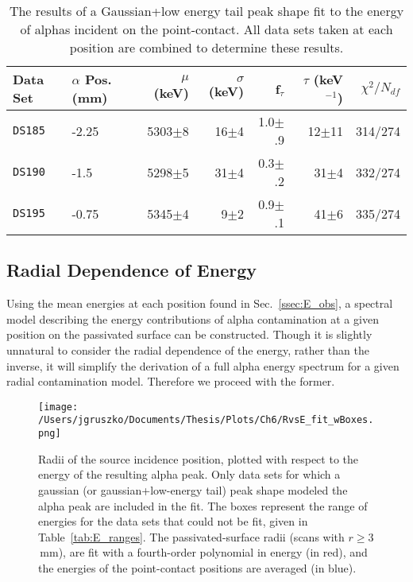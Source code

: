 \begin{table*}[]
\begin{center}
\begin{tabular}{l l r r r r r}
Data Set & $\alpha$ Pos. (mm) & $\mu$ (keV) & $\sigma$ (keV) & f$_{\tau}$ & $\tau$ (keV$^{-1}$)& $\chi^2/N_{df}$ \\  \hline
{\tt DS185} & -2.25 & 5303$\pm$8 & 16$\pm$4 & 1.0$\pm$.9 & 12$\pm$11 & 314/274 \\
{\tt DS190} & -1.5 & 5298$\pm$5 & 31$\pm$4 & 0.3$\pm$.2 & 31$\pm$4 & 332/274 \\
{\tt DS195} & -0.75 & 5345$\pm$4 & 9$\pm$2 & 0.9$\pm$.1 & 41$\pm$6 & 335/274 \\
\end{tabular}
\caption[The results of fits to the alpha energy peak for events occurring in the point contact]{The results of a Gaussian+low energy tail peak shape fit to the energy of alphas incident on the point-contact. All data sets taken at each position are combined to determine these results.} \label{tab:fullE_fitRes}
\end{center}
\end{table*}

\subsection{Radial Dependence of Energy}\label{sssec:spec_fit}
Using the mean energies at each position found in Sec.~\ref{ssec:E_obs}, a spectral model describing the energy contributions of alpha contamination at a given position on the passivated surface can be constructed. Though it is slightly unnatural to consider the radial dependence of the energy, rather than the inverse, it will simplify the derivation of a full alpha energy spectrum for a given radial contamination model. Therefore we proceed with the former.

\begin{figure}[]
 \centering
 \texttt{[image: /Users/jgruszko/Documents/Thesis/Plots/Ch6/RvsE\_fit\_wBoxes.png]}
 \caption[A polynomial fit describing the radial dependence on energy]{Radii of the source incidence position, plotted with respect to the energy of the resulting alpha peak. Only data sets for which a gaussian (or gaussian+low-energy tail) peak shape modeled the alpha peak are included in the fit. The boxes represent the range of energies for the data sets that could not be fit, given in Table~\ref{tab:E_ranges}. The passivated-surface radii (scans with $r\geq3$\,mm), are fit with a fourth-order polynomial in energy (in red), and the energies of the point-contact positions are averaged (in blue).} 
 \label{fig:RvsE_fit}
\end{figure}

